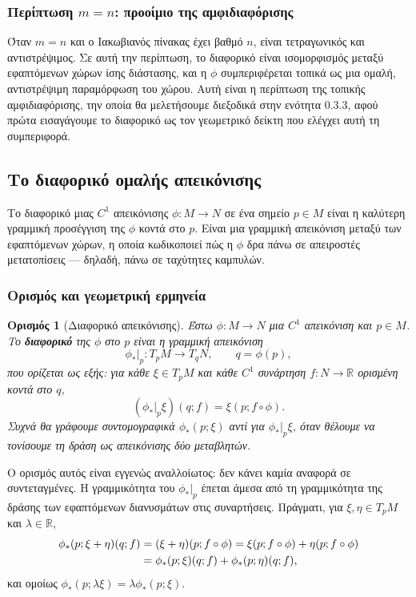 \documentclass[11pt,a4paper,twoside,openright]{book}
\newtheorem{definition}[lemma]{Ορισμός}
\begin{document}
\subsubsection{Περίπτωση $m = n$: προοίμιο της αμφιδιαφόρισης}

Όταν $m = n$ και ο Ιακωβιανός πίνακας έχει βαθμό $n$, είναι τετραγωνικός και αντιστρέψιμος. Σε αυτή την περίπτωση, το διαφορικό είναι ισομορφισμός μεταξύ εφαπτόμενων χώρων ίσης διάστασης, και η $\phi$ συμπεριφέρεται τοπικά ως μια ομαλή, αντιστρέψιμη παραμόρφωση του χώρου. Αυτή είναι η περίπτωση της τοπικής αμφιδιαφόρισης, την οποία θα μελετήσουμε διεξοδικά στην ενότητα 0.3.3, αφού πρώτα εισαγάγουμε το διαφορικό ως τον γεωμετρικό δείκτη που ελέγχει αυτή τη συμπεριφορά.

\subsection{Το διαφορικό ομαλής απεικόνισης}

Το διαφορικό μιας $C^1$ απεικόνισης $\phi: M \to N$ σε ένα σημείο $p \in M$ είναι η καλύτερη γραμμική προσέγγιση της $\phi$ κοντά στο $p$. Είναι μια γραμμική απεικόνιση μεταξύ των εφαπτόμενων χώρων, η οποία κωδικοποιεί πώς η $\phi$ δρα πάνω σε απειροστές μετατοπίσεις --- δηλαδή, πάνω σε ταχύτητες καμπυλών.

\subsubsection{Ορισμός και γεωμετρική ερμηνεία}

\begin{definition}[Διαφορικό απεικόνισης]
Έστω $\phi: M \to N$ μια $C^1$ απεικόνιση και $p \in M$. Το \textbf{διαφορικό} της $\phi$ στο $p$ είναι η γραμμική απεικόνιση
\begin{equation}
\phi_*|_p: T_pM \to T_{q}N, \qquad q = \phi(p),
\end{equation}
που ορίζεται ως εξής: για κάθε $\xi \in T_pM$ και κάθε $C^1$ συνάρτηση $f: N \to \mathbb{R}$ ορισμένη κοντά στο $q$,
\begin{equation}
(\phi_*|_p \xi)(q; f) = \xi(p; f \circ \phi).
\end{equation}
Συχνά θα γράφουμε συντομογραφικά $\phi_*(p; \xi)$ αντί για $\phi_*|_p \xi$, όταν θέλουμε να τονίσουμε τη δράση ως απεικόνισης δύο μεταβλητών.
\end{definition}

Ο ορισμός αυτός είναι εγγενώς αναλλοίωτος: δεν κάνει καμία αναφορά σε συντεταγμένες. Η γραμμικότητα του $\phi_*|_p$ έπεται άμεσα από τη γραμμικότητα της δράσης των εφαπτόμενων διανυσμάτων στις συναρτήσεις. Πράγματι, για $\xi, \eta \in T_pM$ και $\lambda \in \mathbb{R}$,
\begin{align}
\phi_*(p; \xi + \eta)(q; f) &= (\xi + \eta)(p; f \circ \phi) = \xi(p; f \circ \phi) + \eta(p; f \circ \phi) \notag \\
&= \phi_*(p; \xi)(q; f) + \phi_*(p; \eta)(q; f),
\end{align}
και ομοίως $\phi_*(p; \lambda \xi) = \lambda \phi_*(p; \xi)$.
\end{document}
